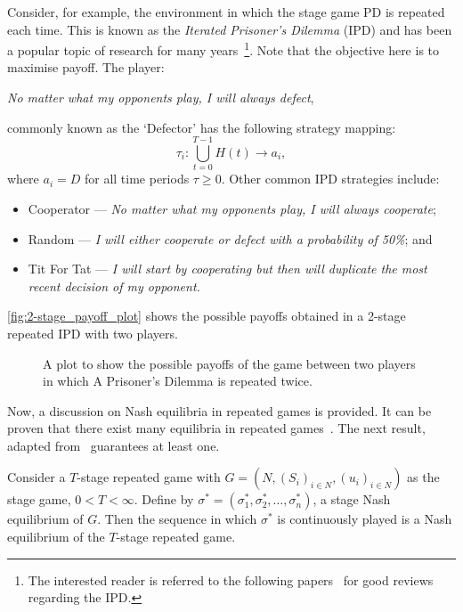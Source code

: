 Consider, for example, the environment in which the stage game PD is repeated each time. This is known as the \textit{Iterated Prisoner's
Dilemma} (IPD) and has been a popular topic of research for many
years~\footnote{The interested reader is referred to the following papers~\cite{Glynatsi2019,Jurisic2012,ORiordan2001} for
good reviews regarding the IPD.}. Note that the objective
here is to maximise payoff. The player: 
\begin{center}
    \textit{No matter what my opponents play, I will always defect},
\end{center}
commonly known as the `Defector' has the following strategy mapping:
\begin{equation}
    \tau_{i} : \bigcup_{t = 0}^{T-1}{H(t)} \to a_{i},    
\end{equation}
where \(a_{i}=D\) for all time periods \(\tau \ge 0\). Other common IPD
strategies include: 
\begin{itemize}
    \item Cooperator --- \textit{No matter what my opponents play, I will always
    cooperate};
    \item Random --- \textit{I will either cooperate or defect with a probability of
    50\%}; and
    \item Tit For Tat --- \textit{I will start by cooperating but then will 
    duplicate the most recent decision of my opponent.}
\end{itemize}

\autoref{fig:2-stage_payoff_plot} shows the possible payoffs obtained in
a 2-stage repeated IPD with two players.

\begin{figure}
    \centering
    
    \caption{A plot to show the possible payoffs of the game between two players in which A Prisoner's Dilemma is repeated twice.}\label{fig:2-stage_payoff_plot}
\end{figure}

Now, a discussion on Nash equilibria in repeated games is provided. It can be
proven that there exist many equilibria in repeated
games~\cite{friedman1971non}. The next result,
adapted from~\cite{Knight2019a,maschler_solan_zamir_2013} guarantees at least
one.

\begin{theorem}
    Consider a \(T\)-stage repeated game with \(G=(N, {(S_{i})}_{i \in N},
    {(u_{i})}_{i \in N})\) as the stage game, \(0 < T < \infty \). Define by
    \( {\sigma}^{*} = (\sigma_{1}^{*}, \sigma_{2}^{*}, \ldots,
    \sigma_{n}^{*})\), a stage Nash equilibrium of \(G\). Then the sequence in
    which \({\sigma}^{*}\) is continuously played is a Nash equilibrium of the
    \(T\)-stage repeated game.
\end{theorem}\label{thm:seq_of_stage_NE} 

